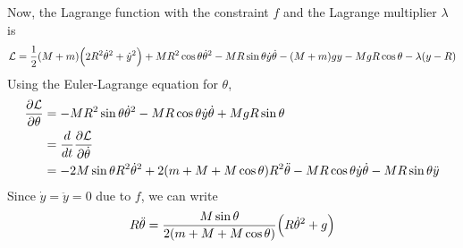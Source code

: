 \documentclass[12pt]{article}
\begin{document}
\begin{problem}{2}
\begin{solution}
    Now, the Lagrange function with the constraint $f$ and the Lagrange
    multiplier $\lambda$ is
    \begin{equation}
        \mathcal{L}=\frac12(M+m)\qty(2R^2\dot\theta^2+\dot{y}^2)+MR^2\cos\theta\dot\theta^2-MR\sin\theta\dot{y}\dot\theta-(M+m)gy-MgR\cos\theta-\lambda(y-R) 
    \end{equation}
    Using the Euler-Lagrange equation for $\theta$,
    \begin{align}
        \frac{\partial\mathcal{L}}{\partial\theta}
        &=-MR^2\sin\theta\dot\theta^2-MR\cos\theta\dot{y}\dot\theta+MgR\sin\theta\notag\\
        &=\frac{d}{dt}\frac{\partial\mathcal{L}}{\partial\dot\theta}\notag\\
        &=-2M\sin\theta
        R^2\dot\theta^2+2(m+M+M\cos\theta)R^2\ddot\theta-MR\cos\theta\dot{y}\dot\theta-MR\sin\theta\ddot{y}
    \end{align}
    Since $\dot{y}=\ddot{y}=0$ due to $f$, we can write
    \begin{equation}\label{p2:tdd}
        R\ddot\theta=\frac{M\sin\theta}{2(m+M+M\cos\theta)}\qty(R\dot\theta^2+g) 
    \end{equation}
    

\end{solution}
\end{problem}
\end{document}
